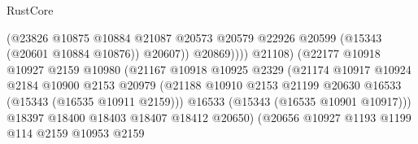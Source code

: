 \begin{lexlean}{RustCore}
\begin{coremodule}
                                                (@23826
                                                  @10875
                                                  @10884
                                                  @21087
                                                  @20573
                                                  @20579
                                                  @22926
                                                  @20599
                                                  (@15343 (@20601 @10884 @10876))
                                                  @20607))
                                              @20869))))
                                      @21108)
                                    (@22177
                                      @10918
                                      @10927
                                      @2159
                                      @10980
                                      (@21167
                                        @10918
                                        @10925
                                        @2329
                                        (@21174
                                          @10917
                                          @10924
                                          @2184
                                          @10900
                                          @2153
                                          @20979
                                          (@21188
                                            @10910
                                            @2153
                                            @21199
                                            @20630
                                            @16533
                                            (@15343 (@16535 @10911 @2159)))
                                          @16533
                                          (@15343 (@16535 @10901 @10917)))
                                        @18397
                                        @18400
                                        @18403
                                        @18407
                                        @18412
                                        @20650)
                                      (@20656
                                        @10927
                                        @1193
                                        @1199
                                        @114
                                        @2159
                                        @10953
                                        @2159

\end{coremodule}
\end{lexlean}
